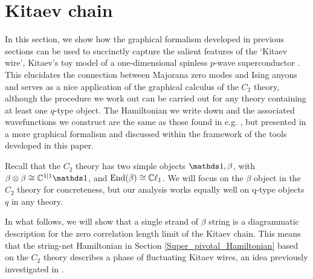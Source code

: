 
\section{Kitaev chain} \label{kitaev_wire}

In this section, we show how the graphical formalism developed in previous sections
can be used to succinctly capture the salient features of the `Kitaev wire', 
Kitaev's toy model of a one-dimensional spinless $p$-wave superconductor \cite{kitaev2001}. 
This elucidates the connection between Majorana zero modes and Ising anyons and serves 
as a nice application of the graphical calculus of the $C_2$ theory, although the procedure we work 
out can be carried out for any theory containing at least one $q$-type object.
The Hamiltonian we write down and the associated wavefunctions we construct are 
the same as those found in e.g. \cite{fidkowski2011}, but presented in a more graphical formalism and 
discussed within the framework of the tools developed in this paper. 

Recall that the $C_2$ theory has two simple objects $\unit,\beta$,
with $\beta\tp \beta\cong \cc^{1|1}\unit$,
and $\text{End}(\beta) \cong \mathbb{C}\ell_1$.
We will focus on the $\beta$ object in the $C_2$ 
theory for concreteness, but our analysis works equally well on q-type objects $q$ in any theory.

In what follows, we will show that a single strand of $\beta$ string is a diagrammatic description for the zero correlation length limit of the Kitaev chain.
This means that the string-net Hamiltonian in Section \ref{Super_pivotal_Hamiltonian} 
based on the $C_2$ theory describes a phase of fluctuating Kitaev wires, 
an idea previously investigated in \cite{tarantino2016,ware2016}.

